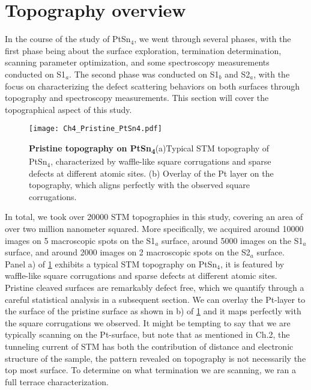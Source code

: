 \section{Topography overview}
\par In the course of the study of PtSn$_4$, we went through several phases, with the first phase being about the surface exploration, termination determination, scanning parameter optimization, and some spectroscopy measurements conducted on S1$_a$. The second phase was conducted on S1$_b$ and S2$_a$, with the focus on characterizing the defect scattering behaviors on both surfaces through topography and spectroscopy measurements. This section will cover the topographical aspect of this study. 

\begin{figure}
	\centering
	\texttt{[image: Ch4\_Pristine\_PtSn4.pdf]}
	\caption[\textbf{Pristine topography on PtSn\textsubscript{4}}]{\textbf{Pristine topography on PtSn\textsubscript{4}}(a)Typical STM topography of PtSn$_4$, characterized by waffle-like square corrugations and sparse defects at different atomic sites. (b) Overlay of the Pt layer on the topography, which aligns perfectly with the observed square corrugations.}
	\label{fig:ch4_pristinetopo}
\end{figure}

\par In total, we took over 20000 STM topographies in this study, covering an area of over two million nanometer squared. More specifically, we acquired around 10000 images on 5 macroscopic spots on the S1$_a$ surface, around 5000 images on the S1$_a$ surface, and around 2000 images on 2 macroscopic spots on the S2$_a$ surface. 
Panel a) of \ref{fig:ch4_pristinetopo} exhibits a typical STM topography on PtSn$_4$, it is featured by waffle-like square corrugations and sparse defects at different atomic sites. Pristine cleaved surfaces are remarkably defect free, which we quantify through a careful statistical analysis in a subsequent section. We can overlay the Pt-layer to the surface of the pristine surface as shown in b) of \ref{fig:ch4_pristinetopo} and it maps perfectly with the square corrugations we observed. It might be tempting to say that we are typically scanning on the Pt-surface, but note that as mentioned in Ch.2, the tunneling current of STM has both the contribution of distance and electronic structure of the sample, the pattern revealed on topography is not necessarily the top most surface. To determine on what termination we are scanning, we ran a full terrace characterization.


